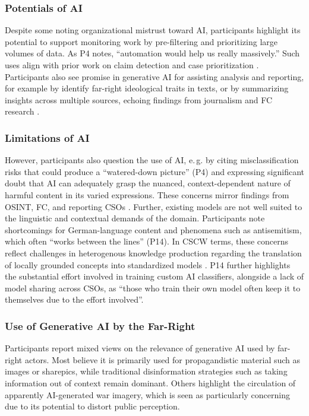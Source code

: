 \documentclass[acmsmall]{acmart}
\begin{document}
\subsubsection{Potentials of AI}
Despite some noting organizational mistrust toward AI, participants highlight its potential to support monitoring work by pre-filtering and prioritizing large volumes of data. As P4 notes, ``automation would help us really massively.'' Such uses align with prior work on claim detection and case prioritization \cite{hrckova_autonomation_2024,baumler_harnessing_2025}.
Participants also see promise in generative AI for assisting analysis and reporting, for example by identify far-right ideological traits in texts, or by summarizing insights across multiple sources, echoing findings from journalism and FC research \cite{liu_human-centered_2024,wolfe_implications_2024,cifliku_save_2025,procter_observations_2023}.

\subsubsection{Limitations of AI}
\label{sssec:limitations_AI_classification}
However, participants also question the use of AI, e.\,g. by citing misclassification risks that could produce a ``watered-down picture'' (P4) and expressing significant doubt that AI can adequately grasp the nuanced, context-dependent nature of harmful content in its varied expressions. These concerns mirror findings from OSINT, FC, and reporting CSOs \cite{juneja_human_2022,hrckova_autonomation_2024,mukhopadhyay_osint_2024,skopik_osint_nlp_2024,baumler_harnessing_2025}.
Further, existing models are not well suited to the linguistic and contextual demands of the domain. Participants note shortcomings for German-language content and phenomena such as antisemitism, which often ``works between the lines'' (P14). In CSCW terms, these concerns reflect challenges in heterogenous knowledge production regarding the translation of locally grounded concepts into standardized models \cite{star_institutional_1989,ackerman_sharing_2013}. P14 further highlights the substantial effort involved in training custom AI classifiers, alongside a lack of model sharing across CSOs, as ``those who train their own model often keep it to themselves due to the effort involved''.

\subsubsection{Use of Generative AI by the Far-Right}
Participants report mixed views on the relevance of generative AI used by far-right actors. Most believe it is primarily used for propagandistic material such as images or sharepics, while traditional disinformation strategies such as taking information out of context remain dominant. 
Others highlight the circulation of apparently AI-generated war imagery, which is seen as particularly concerning due to its potential to distort public perception.
\end{document}
